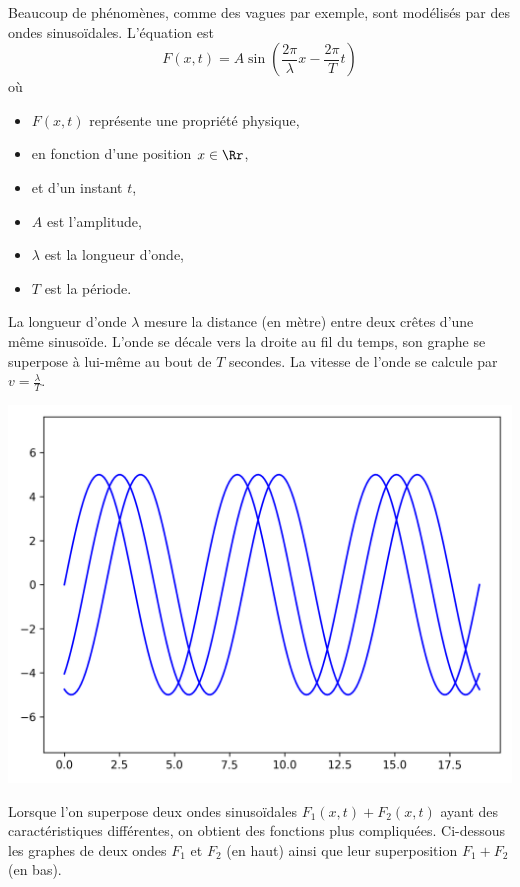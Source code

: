 \documentclass[11pt,class=report,crop=false]{standalone}
\begin{document}
Beaucoup de phénomènes, comme des vagues par exemple, sont modélisés par des ondes sinusoïdales. L'équation est 
$$F(x,t) = A \sin\left(\frac{2\pi}{\lambda} x -  \frac{2\pi}{T} t\right)$$
où 
\begin{itemize}
	\item $F(x,t)$ représente une propriété physique,
	\item en fonction d'une position $x\in\Rr$,
	\item et d'un instant $t$,
	\item $A$ est l'amplitude,
	\item $\lambda$ est la longueur d'onde,
	\item $T$ est la période.
\end{itemize}

La longueur d'onde $\lambda$ mesure la distance (en mètre) entre deux crêtes d'une même sinusoïde. 
L'onde se décale vers la droite au fil du temps, son graphe se superpose à lui-même au bout de $T$ secondes.
La vitesse de l'onde se calcule par $v = \frac{\lambda}{T}$. 

\begin{center}
	\includegraphics[scale=\myscale,scale=0.5]{figures/ondes1D-2}
\end{center}


Lorsque l'on superpose deux ondes sinusoïdales $F_1(x,t) + F_2(x,t)$ ayant des caractéristiques différentes, on obtient des fonctions plus compliquées. Ci-dessous les graphes de deux ondes $F_1$ et $F_2$ (en haut) ainsi que leur superposition $F_1+F_2$ (en bas).
\end{document}

